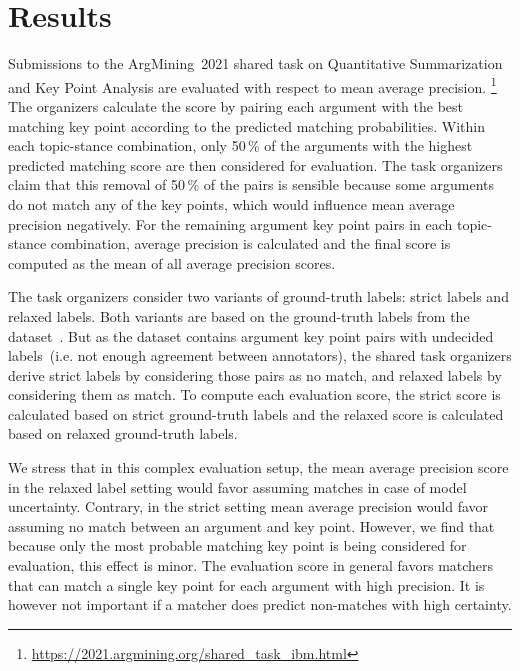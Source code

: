 \section{Results}\label{results}


Submissions to the ArgMining~2021 shared task on Quantitative Summarization and Key Point Analysis are evaluated with 
respect to mean average precision.%
\footnote{\url{https://2021.argmining.org/shared_task_ibm.html}}
The organizers calculate the score by pairing each argument with the best matching key point according to the predicted 
matching probabilities.
Within each topic-stance combination, only 50\,\% of the arguments with the highest predicted matching score are then 
considered for evaluation.
The task organizers claim that this removal of 50\,\% of the pairs is sensible because some arguments do not match any 
of the key points, which would influence mean average precision negatively. %
For the remaining argument key point pairs in each topic-stance combination, average precision is calculated and the 
final score is computed as the mean of all average precision scores.

The task organizers consider two variants of ground-truth labels: strict labels and relaxed labels.
Both variants are based on the ground-truth labels from the \ArgKP dataset~\cite{Bar-HaimEFKLS2020}. But as the \ArgKP 
dataset contains argument key point pairs with undecided labels~(i.e. not enough agreement between annotators), 
the shared task organizers derive strict labels by considering those pairs as no match, and relaxed labels by 
considering them as match. %
To compute each evaluation score, the strict score is calculated based on strict ground-truth labels and the relaxed 
score is calculated based on relaxed ground-truth labels. %

We stress that in this complex evaluation setup, the mean average precision score in the relaxed label setting would 
favor assuming matches in case of model uncertainty.
Contrary, in the strict setting mean average precision would favor assuming no match between an argument and key point.
However, we find that because only the most probable matching key point is being considered for evaluation, this effect is minor.
The evaluation score in general favors matchers that can match a single key point for each argument with high precision.
It is however not important if a matcher does predict non-matches with high certainty.

